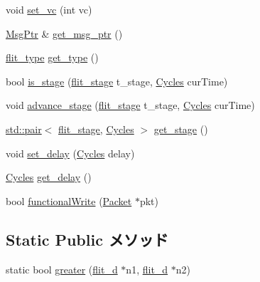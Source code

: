 \begin{DoxyCompactItemize}
void \hyperlink{classflit__d_a4ce1a22dd3bca1c2111888b02d8f6baa}{set\_\-vc} (int vc)
\item 
\hyperlink{classRefCountingPtr}{MsgPtr} \& \hyperlink{classflit__d_a9f89b30096bceae33be8dffc50b8b936}{get\_\-msg\_\-ptr} ()
\item 
\hyperlink{NetworkHeader_8hh_a2c6c8cfc6307d086e578093535798328}{flit\_\-type} \hyperlink{classflit__d_aed49ea5767b0f608eccf13129374085a}{get\_\-type} ()
\item 
bool \hyperlink{classflit__d_a67dbc89734ed2920ed59fed25516e155}{is\_\-stage} (\hyperlink{NetworkHeader_8hh_a1af1206699d48009a5cbd0c2c1d7ce15}{flit\_\-stage} t\_\-stage, \hyperlink{classCycles}{Cycles} curTime)
\item 
void \hyperlink{classflit__d_a17bbaff3a91e4b25da1d3486641d5e69}{advance\_\-stage} (\hyperlink{NetworkHeader_8hh_a1af1206699d48009a5cbd0c2c1d7ce15}{flit\_\-stage} t\_\-stage, \hyperlink{classCycles}{Cycles} curTime)
\item 
\hyperlink{classstd_1_1pair}{std::pair}$<$ \hyperlink{NetworkHeader_8hh_a1af1206699d48009a5cbd0c2c1d7ce15}{flit\_\-stage}, \hyperlink{classCycles}{Cycles} $>$ \hyperlink{classflit__d_a741022810b1515cb347e4d075ff4e731}{get\_\-stage} ()
\item 
void \hyperlink{classflit__d_ab5c471d239a55ffb064ca98eaabcc022}{set\_\-delay} (\hyperlink{classCycles}{Cycles} delay)
\item 
\hyperlink{classCycles}{Cycles} \hyperlink{classflit__d_a0b5775391c8bacccecf70b147a7dd3e6}{get\_\-delay} ()
\item 
bool \hyperlink{classflit__d_a14bf46f4c6bb79e5357096af6b9dbffa}{functionalWrite} (\hyperlink{classPacket}{Packet} $\ast$pkt)
\end{DoxyCompactItemize}
\subsection*{Static Public メソッド}
\begin{DoxyCompactItemize}
\item 
static bool \hyperlink{classflit__d_a301487bb8e4572d3612dbb1702092b21}{greater} (\hyperlink{classflit__d}{flit\_\-d} $\ast$n1, \hyperlink{classflit__d}{flit\_\-d} $\ast$n2)
\end{DoxyCompactItemize}
